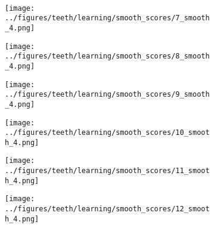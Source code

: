 \begin{figure}[h!]
	\vspace{-0.35cm}
	\\
			\begin{subfigure}[b]{0.03\textwidth} %
		\centering
	\end{subfigure}
	\begin{subfigure}{0.15\textwidth}
		\centering
		\texttt{[image: ../figures/teeth/learning/smooth\_scores/7\_smooth\_4.png]}
		\label{fig:1}
	\end{subfigure}
	\begin{subfigure}{0.15\textwidth}
		\centering
		\texttt{[image: ../figures/teeth/learning/smooth\_scores/8\_smooth\_4.png]}
		\label{fig:1}
	\end{subfigure}
	\begin{subfigure}{0.15\textwidth}
		\centering
		\texttt{[image: ../figures/teeth/learning/smooth\_scores/9\_smooth\_4.png]}
		\label{fig:1}
	\end{subfigure}
	\begin{subfigure}{0.15\textwidth}
		\centering
		\texttt{[image: ../figures/teeth/learning/smooth\_scores/10\_smooth\_4.png]}
		\label{fig:1}
	\end{subfigure}
	\begin{subfigure}{0.15\textwidth}
		\centering
		\texttt{[image: ../figures/teeth/learning/smooth\_scores/11\_smooth\_4.png]}
		\label{fig:1}
	\end{subfigure}
	\begin{subfigure}{0.15\textwidth}
		\centering
		\texttt{[image: ../figures/teeth/learning/smooth\_scores/12\_smooth\_4.png]}
		\label{fig:1}
	\end{subfigure}

\end{figure}
